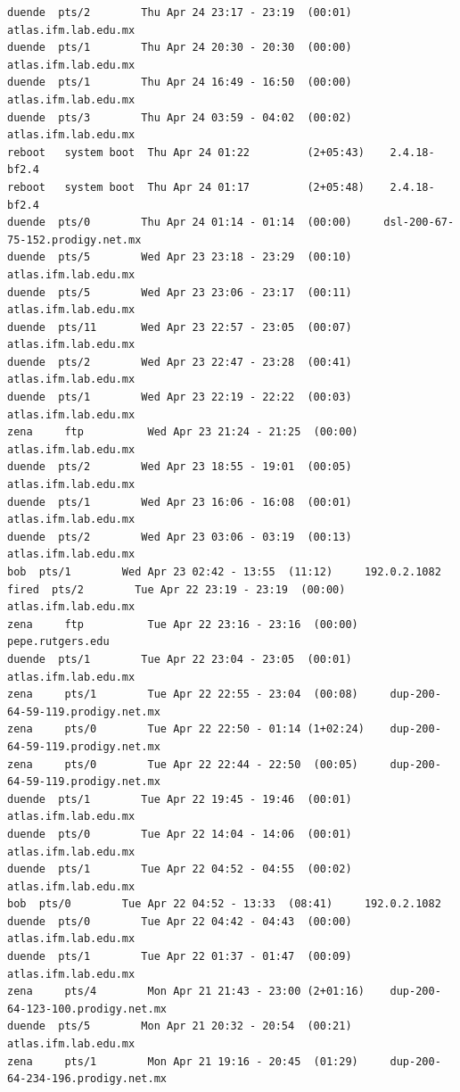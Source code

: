 \begin{lstlisting}[style=terminal]
duende  pts/2        Thu Apr 24 23:17 - 23:19  (00:01)     atlas.ifm.lab.edu.mx
duende  pts/1        Thu Apr 24 20:30 - 20:30  (00:00)     atlas.ifm.lab.edu.mx
duende  pts/1        Thu Apr 24 16:49 - 16:50  (00:00)     atlas.ifm.lab.edu.mx
duende  pts/3        Thu Apr 24 03:59 - 04:02  (00:02)     atlas.ifm.lab.edu.mx
reboot   system boot  Thu Apr 24 01:22         (2+05:43)    2.4.18-bf2.4
reboot   system boot  Thu Apr 24 01:17         (2+05:48)    2.4.18-bf2.4
duende  pts/0        Thu Apr 24 01:14 - 01:14  (00:00)     dsl-200-67-75-152.prodigy.net.mx
duende  pts/5        Wed Apr 23 23:18 - 23:29  (00:10)     atlas.ifm.lab.edu.mx
duende  pts/5        Wed Apr 23 23:06 - 23:17  (00:11)     atlas.ifm.lab.edu.mx
duende  pts/11       Wed Apr 23 22:57 - 23:05  (00:07)     atlas.ifm.lab.edu.mx
duende  pts/2        Wed Apr 23 22:47 - 23:28  (00:41)     atlas.ifm.lab.edu.mx
duende  pts/1        Wed Apr 23 22:19 - 22:22  (00:03)     atlas.ifm.lab.edu.mx
zena     ftp          Wed Apr 23 21:24 - 21:25  (00:00)     atlas.ifm.lab.edu.mx
duende  pts/2        Wed Apr 23 18:55 - 19:01  (00:05)     atlas.ifm.lab.edu.mx
duende  pts/1        Wed Apr 23 16:06 - 16:08  (00:01)     atlas.ifm.lab.edu.mx
duende  pts/2        Wed Apr 23 03:06 - 03:19  (00:13)     atlas.ifm.lab.edu.mx
bob  pts/1        Wed Apr 23 02:42 - 13:55  (11:12)     192.0.2.1082
fired  pts/2        Tue Apr 22 23:19 - 23:19  (00:00)     atlas.ifm.lab.edu.mx
zena     ftp          Tue Apr 22 23:16 - 23:16  (00:00)     pepe.rutgers.edu
duende  pts/1        Tue Apr 22 23:04 - 23:05  (00:01)     atlas.ifm.lab.edu.mx
zena     pts/1        Tue Apr 22 22:55 - 23:04  (00:08)     dup-200-64-59-119.prodigy.net.mx
zena     pts/0        Tue Apr 22 22:50 - 01:14 (1+02:24)    dup-200-64-59-119.prodigy.net.mx
zena     pts/0        Tue Apr 22 22:44 - 22:50  (00:05)     dup-200-64-59-119.prodigy.net.mx
duende  pts/1        Tue Apr 22 19:45 - 19:46  (00:01)     atlas.ifm.lab.edu.mx
duende  pts/0        Tue Apr 22 14:04 - 14:06  (00:01)     atlas.ifm.lab.edu.mx
duende  pts/1        Tue Apr 22 04:52 - 04:55  (00:02)     atlas.ifm.lab.edu.mx
bob  pts/0        Tue Apr 22 04:52 - 13:33  (08:41)     192.0.2.1082
duende  pts/0        Tue Apr 22 04:42 - 04:43  (00:00)     atlas.ifm.lab.edu.mx
duende  pts/1        Tue Apr 22 01:37 - 01:47  (00:09)     atlas.ifm.lab.edu.mx
zena     pts/4        Mon Apr 21 21:43 - 23:00 (2+01:16)    dup-200-64-123-100.prodigy.net.mx
duende  pts/5        Mon Apr 21 20:32 - 20:54  (00:21)     atlas.ifm.lab.edu.mx
zena     pts/1        Mon Apr 21 19:16 - 20:45  (01:29)     dup-200-64-234-196.prodigy.net.mx

\end{lstlisting}
